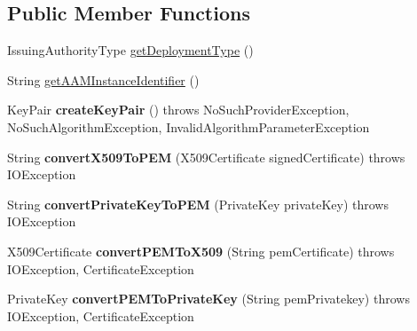 \subsection*{Public Member Functions}
\begin{DoxyCompactItemize}
\item 
Issuing\+Authority\+Type \hyperlink{classeu_1_1h2020_1_1symbiote_1_1security_1_1commons_1_1RegistrationManager_a91aae367f791d2443bc515b2a1e85e6c}{get\+Deployment\+Type} ()
\item 
String \hyperlink{classeu_1_1h2020_1_1symbiote_1_1security_1_1commons_1_1RegistrationManager_a913089ea97d7dc5e4ad18456732cf518}{get\+A\+A\+M\+Instance\+Identifier} ()
\item 
Key\+Pair {\bfseries create\+Key\+Pair} ()  throws No\+Such\+Provider\+Exception, No\+Such\+Algorithm\+Exception,             Invalid\+Algorithm\+Parameter\+Exception \hypertarget{classeu_1_1h2020_1_1symbiote_1_1security_1_1commons_1_1RegistrationManager_ab6d69999be9f251c5e8d8d99539a1d09}{}\label{classeu_1_1h2020_1_1symbiote_1_1security_1_1commons_1_1RegistrationManager_ab6d69999be9f251c5e8d8d99539a1d09}

\item 
String {\bfseries convert\+X509\+To\+P\+EM} (X509\+Certificate signed\+Certificate)  throws I\+O\+Exception \hypertarget{classeu_1_1h2020_1_1symbiote_1_1security_1_1commons_1_1RegistrationManager_a9cc618e3776ae6003c97e4f78359c1f6}{}\label{classeu_1_1h2020_1_1symbiote_1_1security_1_1commons_1_1RegistrationManager_a9cc618e3776ae6003c97e4f78359c1f6}

\item 
String {\bfseries convert\+Private\+Key\+To\+P\+EM} (Private\+Key private\+Key)  throws I\+O\+Exception \hypertarget{classeu_1_1h2020_1_1symbiote_1_1security_1_1commons_1_1RegistrationManager_aa4d9b397346819f854e658f753bb6327}{}\label{classeu_1_1h2020_1_1symbiote_1_1security_1_1commons_1_1RegistrationManager_aa4d9b397346819f854e658f753bb6327}

\item 
X509\+Certificate {\bfseries convert\+P\+E\+M\+To\+X509} (String pem\+Certificate)  throws I\+O\+Exception, Certificate\+Exception \hypertarget{classeu_1_1h2020_1_1symbiote_1_1security_1_1commons_1_1RegistrationManager_a4cd2fc240d24c8d3516960115565d34f}{}\label{classeu_1_1h2020_1_1symbiote_1_1security_1_1commons_1_1RegistrationManager_a4cd2fc240d24c8d3516960115565d34f}

\item 
Private\+Key {\bfseries convert\+P\+E\+M\+To\+Private\+Key} (String pem\+Privatekey)  throws I\+O\+Exception, Certificate\+Exception \hypertarget{classeu_1_1h2020_1_1symbiote_1_1security_1_1commons_1_1RegistrationManager_a5dfadf87c49497e97b516f9364d6cb1e}{}\label{classeu_1_1h2020_1_1symbiote_1_1security_1_1commons_1_1RegistrationManager_a5dfadf87c49497e97b516f9364d6cb1e}


\end{DoxyCompactItemize}
